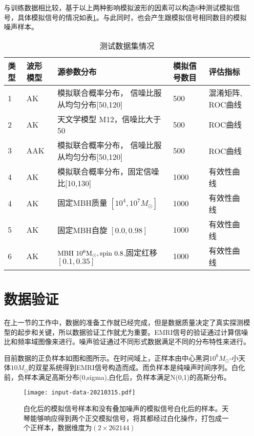 与训练数据相比较，基于以上两种影响模拟波形的因素可以构造6种测试模拟信号，具体模拟信号的情况如表\ref{tab:test-wave}。与此同时，也会产生跟模拟信号相同数目的模拟噪声样本。
\begin{table}[!htbp] 
\caption{测试数据集情况}  
\wuhao
\begin{tabularx}{\textwidth}
	{p{}%
	p{}%
	p{}%
	p{}%
	p{}}  %
\hline                      %
类型 & 波形模型  & 源参数分布   & 模拟信号数目 & 评估指标  \\  
\hline  
1  & AK & 模拟联合概率分布， 信噪比服从均匀分布[50,120] & 500  & 混淆矩阵, ROC曲线  \\ 
2  & AK & 天文学模型 M12，信噪比大于50 & 500  & ROC曲线 \\ 
3  & AAK & 模拟联合概率分布， 信噪比服从均匀分布[50,120] & 500  & ROC曲线  \\ 
4  & AK & 模拟联合概率分布，固定信噪比[10,130] & 1000  & 有效性曲线\\ 
4  & AK & 固定MBH质量 $[10^4, 10^7M_{\odot}]$ & 1000  & 有效性曲线\\
5  & AK & 固定MBH自旋 $[0.0, 0.98]$ & 1000  & 有效性曲线\\
6  & AK & $\rm MBH\ 10^6M_{\odot},\rm spin\ 0.8$,固定红移 $[0.1,0.35]$ & 1000  & 有效性曲线\\
\hline  
\end{tabularx} 
\label{tab:test-wave} 
\end{table}  



\section{数据验证}
在上一节的工作中，数据的准备工作就已经完成，但是数据质量决定了真实探测模型的起步和关键，所以数据验证工作就尤为重要。EMRI信号的验证通过计算信噪比和频率域图像来进行。噪声验证通过不同形式数据满足不同的分布特性来进行。

目前数据的正负样本如图和图所示。在时间域上，正样本由中心黑洞$10^6 M_{\odot}$-小天体$10 M_{\odot}$的双星系统得到EMRI信号构造而成。而负样本是纯噪声时间序列。白化前，负样本满足高斯分布(0,sigma),白化后，负样本满足N(0,1)的高斯分布。
\begin{figure}[!htbp]
 \centering
 \texttt{[image: input-data-20210315.pdf]}
    \caption{\label{fig:input-data}白化后的模拟信号样本和没有叠加噪声的模拟信号白化后的样本。天琴能够响应得到两个正交模拟信号，将其都经过白化操作，打包成一个正样本，数据维度为$(2 \times 262144)$}
\end{figure}



